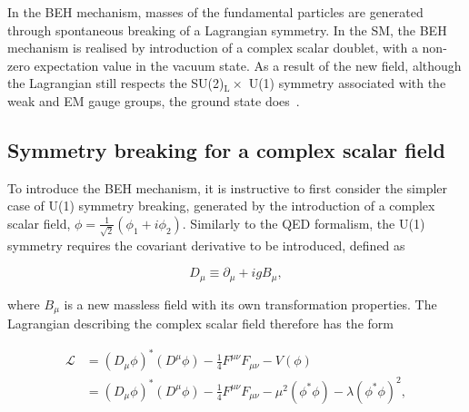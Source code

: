 In the BEH mechanism, masses of the fundamental particles are generated through spontaneous breaking of a Lagrangian symmetry. In the SM, the BEH mechanism is realised by introduction of a complex scalar doublet, with a non-zero expectation value in the vacuum state. As a result of the new field, although the Lagrangian still respects the SU(2)$_{\mathrm{L}}\times$ U(1) symmetry associated with the weak and EM gauge groups, the ground state does~\cite{BroutEnglert,HiggsBS1,HiggsBS2,HiggsBS3,Kibble}.


\subsection{Symmetry breaking for a complex scalar field}

To introduce the BEH mechanism, it is instructive to first consider the simpler case of U(1) symmetry breaking, generated by the introduction of a complex scalar field, $\phi=\frac{1}{\sqrt{2}}(\phi_{1} + i\phi_{2})$. Similarly to the QED formalism, the U(1) symmetry requires the covariant derivative to be introduced, defined as~\cite{Thomson}

\begin{equation}
    D_{\mu} \equiv \partial_{\mu} + igB_{\mu},
\end{equation}

\noindent where $B_{\mu}$ is a new massless field with its own transformation properties. The Lagrangian describing the complex scalar field therefore has the form~\cite{Thomson}

\begin{align}
\label{eqn:complex_scalar_lagrangian}
    \mathcal{L} &= (D_{\mu}\phi)^{*}(D^{\mu}\phi) -\frac{1}{4}F^{\mu\nu}F_{\mu\nu} - V(\phi) \nonumber \\
    &= (D_{\mu}\phi)^{*}(D^{\mu}\phi) -\frac{1}{4}F^{\mu\nu}F_{\mu\nu} - \mu^{2}(\phi^{*}\phi) - \lambda(\phi^{*}\phi)^{2},
\end{align}

